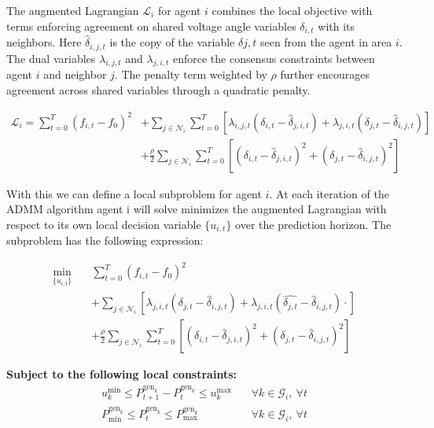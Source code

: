 \documentclass{article}
\begin{document}
The augmented Lagrangian $\mathcal{L}_i$ for agent $i$ combines the local objective with terms enforcing agreement on shared voltage angle variables $\delta_{i,t}$ with its neighbors. Here $\hat{\delta}_{i,j,t}$ is the copy of the variable $\delta{j,t}$ seen from the agent in area $i$. The dual variables $\lambda_{i,j,t}$ and $\lambda_{j,i,t}$ enforce the consensus constraints between agent $i$ and neighbor $j$. The penalty term weighted by $\rho$ further encourages agreement across shared variables through a quadratic penalty.
 
\begin{align}
    \mathcal{L}_i = \sum_{t=0}^{T} (f_{i,t} - f_0)^2 &+ \sum_{j \in \mathcal{N}_i} \sum_{t=0}^T \left[ \lambda_{i,j,t} (\delta_{i,t} - \hat{\delta}_{j,i,t}) + \lambda_{j,i,t} (\delta_{j,t} - \hat{\delta}_{i,j,t}) \right] \nonumber \\
    &+ \frac{\rho}{2} \sum_{j \in \mathcal{N}_i} \sum_{t=0}^T \left[ (\delta_{i,t} - \hat{\delta}_{j,i,t})^2 + (\delta_{j,t} - \hat{\delta}_{i,j,t})^2 \right]
\end{align}

With this we can define a local subproblem for agent $i$. At each iteration of the ADMM algorithm agent i will solve minimizes the augmented Lagrangian with respect to its own local decision variable $\{u_{i,t}\}$ over the prediction horizon. The subproblem has the following expression:

\begin{align}
    \min_{\{u_{i,t}\}} \quad & \sum_{t=0}^{T} (f_{i,t} - f_0)^2 \nonumber \\
    &+ \sum_{j \in \mathcal{N}_i} \left[ \lambda_{j,i,t}(\delta_{j,t} - \hat{\delta}_{i,j,t})  + \lambda_{j,i,t}(\hat{\delta_{j,t}} - \hat{\delta}_{i, j, t}) \cdot  \right] \nonumber \\
    &+ \frac{\rho}{2} \sum_{j \in \mathcal{N}_i} \sum_{t=0}^T \left[ (\delta_{i,t} - \hat{\delta}_{j,i,t})^2 + (\delta_{j,t} - \hat{\delta}_{i,j,t})^2 \right]
\end{align}

\textbf{Subject to the following local constraints:}
\begin{align}
    u^{\min}_k \leq P^{\text{gen}_k}_{t+1} - P^{\text{gen}_k}_t \leq u^{\max}_k \quad &\forall k \in \mathcal{G}_i,\ \forall t \\
    P^{\text{gen}_k}_{\min} \leq P^{\text{gen}_k}_t \leq P^{\text{gen}_k}_{\max} \quad &\forall k \in \mathcal{G}_i,\ \forall t
\end{align}
\end{document}
